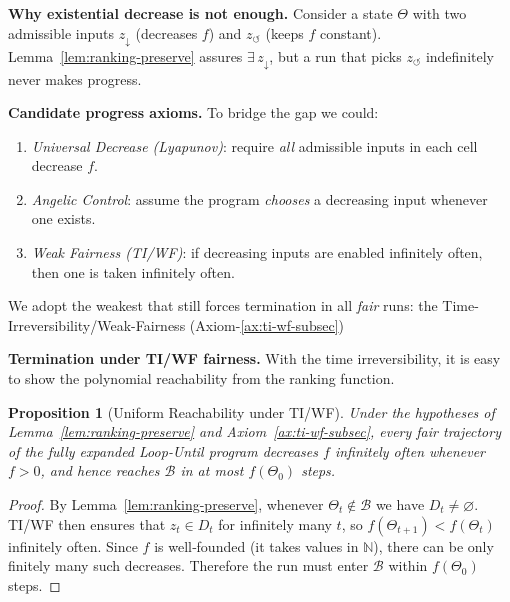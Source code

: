 \documentclass[12pt]{article}
\theoremstyle{definition}
\theoremstyle{plain}
\newtheorem{proposition}{Proposition}[section]
\begin{document}
\medskip
\noindent\textbf{Why existential decrease is not enough.}  
Consider a state $\Theta$ with two admissible inputs $z_\downarrow$ (decreases $f$) and $z_\circlearrowleft$ (keeps $f$ constant).  Lemma~\ref{lem:ranking-preserve} assures $\exists\,z_\downarrow$, but a run that picks $z_\circlearrowleft$ indefinitely never makes progress.

\medskip
\noindent\textbf{Candidate progress axioms.}  To bridge the gap we could:
\begin{enumerate}[label=(\roman*)]
  \item \emph{Universal Decrease (Lyapunov)}: require \emph{all} admissible inputs in each cell decrease $f$.
  \item \emph{Angelic Control}: assume the program \emph{chooses} a decreasing input whenever one exists.
  \item \emph{Weak Fairness (TI/WF)}: if decreasing inputs are enabled infinitely often, then one is taken infinitely often.
\end{enumerate}

We adopt the weakest that still forces termination in all \emph{fair} runs: the Time-Irreversibility/Weak-Fairness (Axiom-\ref{ax:ti-wf-subsec})

\medskip
\noindent\textbf{Termination under TI/WF fairness.} With the time irreversibility, it is easy to show the polynomial reachability from the ranking function.

\begin{proposition}[Uniform Reachability under TI/WF]
\label{prop:uniform-reachability-fair}
Under the hypotheses of Lemma~\ref{lem:ranking-preserve} and Axiom~\ref{ax:ti-wf-subsec}, every \emph{fair} trajectory of the fully expanded Loop‑Until program decreases $f$ infinitely often whenever $f>0$, and hence reaches $\mathcal B$ in at most $f(\Theta_0)$ steps.
\end{proposition}

\begin{proof}
By Lemma~\ref{lem:ranking-preserve}, whenever $\Theta_t\notin\mathcal B$ we have $D_t\neq\varnothing$.  TI/WF then ensures that $z_t\in D_t$ for infinitely many $t$, so $f(\Theta_{t+1})<f(\Theta_t)$ infinitely often.  Since $f$ is well‐founded (it takes values in $\mathbb N$), there can be only finitely many such decreases.  Therefore the run must enter $\mathcal B$ within $f(\Theta_0)$ steps.
\end{proof}
\end{document}

